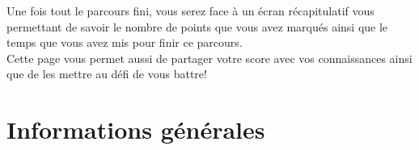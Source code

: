 \documentclass[11pt]{scrreprt}
\begin{document}
    Une fois tout le parcours fini, vous serez face à un écran récapitulatif vous permettant de savoir le nombre de points que vous avez marqués ainsi que le temps que vous avez mis pour finir ce parcours.\\

    Cette page vous permet aussi de partager votre score avec vos connaissances ainsi que de les mettre au défi de vous battre!

    \section{Informations générales}
    \begin{figure}[H]
        \centering
        \mbox{\quad\quad\quad
}
\end{figure}
\end{document}

